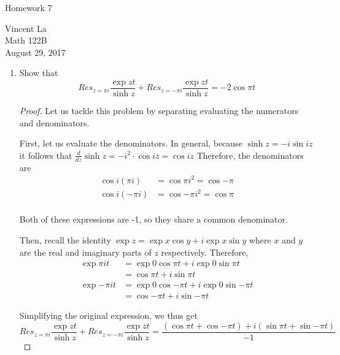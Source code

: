 \documentclass[11pt]{article}
\title{ }
\begin{document}
	\begin{center}	%
		\Large{Homework 7}	%
	\end{center}
	\begin{center}
		Vincent La \\
		Math 122B \\
		August 29, 2017
	\end{center}
	
\begin{enumerate}
	\item Show that
	\[Res_{z=\pi i} \frac{\exp{zt}}{\sinh{z}} + Res_{z=-\pi i} \frac{\exp{zt}}{\sinh{z}} = -2\cos{\pi t} \]
	
	\begin{proof}
		Let us tackle this problem by separating evaluating the numerators and denominators.
		
		\bigskip
		
		First, let us evaluate the denominators. In general, because
		$\sinh{z} = -i\sin{iz}$
		it follows that 
		$\frac{d}{dz} \sinh{z} = -i^2 \cdot \cos{iz} = \cos{iz}$
		Therefore, the denominators are
			\[\begin{aligned}
			\cos{i(\pi i)} &= \cos{\pi i^2} = \cos{-\pi}\\
			\cos{i(-\pi i)} &= \cos{-\pi i^2} = \cos{\pi}\\			
			\end{aligned}\]
			
		Both of these expressions are -1, so they share a common denominator.
		
		\bigskip
		
		Then, recall the identity
		$\exp{z} = \exp{x}\cos{y} + i \exp{x}\sin{y}$
		where $x$ and $y$ are the real and imaginary parts of $z$ respectively. Therefore,
		\[\begin{aligned}
		\exp{\pi it}
			&= \exp{0}\cos{\pi t} + i\exp{0} \sin{\pi t} \\
			&= \cos{\pi t} + i\sin{\pi t} \\
		\exp{-\pi it}
			&= \exp{0}\cos{-\pi t} + i\exp{0} \sin{-\pi t} \\		
			&= \cos{-\pi t} + i\sin{-\pi t}
		\end{aligned}\]
		
		\bigskip
		
		Simplifying the original expression, we thus get
		\[ Res_{z=\pi i} \frac{\exp{zt}}{\sinh{z}} + Res_{z=-\pi i} \frac{\exp{zt}}{\sinh{z}}
		=  \frac{ (\cos{\pi t} + \cos{-\pi t}) + i( \sin{\pi t} + \sin{-\pi t} )}{
				   -1} \]
				

\end{proof}
\end{enumerate}
\end{document}
